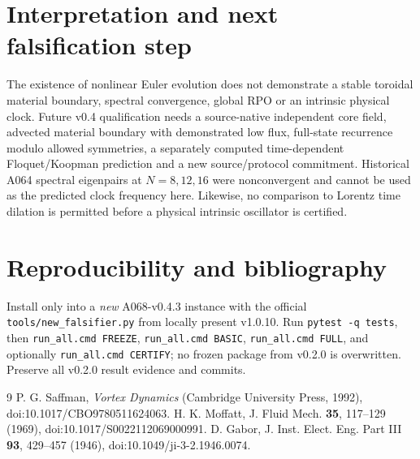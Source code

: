 \documentclass[11pt,a4paper]{article}
\begin{document}
\section{Interpretation and next falsification step}
The existence of nonlinear Euler evolution does not demonstrate a stable toroidal material boundary, spectral convergence, global RPO or an intrinsic physical clock. Future v0.4 qualification needs a source-native independent core field, advected material boundary with demonstrated low flux, full-state recurrence modulo allowed symmetries, a separately computed time-dependent Floquet/Koopman prediction and a new source/protocol commitment. Historical A064 spectral eigenpairs at $N=8,12,16$ were nonconvergent and cannot be used as the predicted clock frequency here. Likewise, no comparison to Lorentz time dilation is permitted before a physical intrinsic oscillator is certified.

\section{Reproducibility and bibliography}
Install only into a \emph{new} A068-v0.4.3 instance with the official \texttt{tools/new\_falsifier.py} from locally present v1.0.10. Run \texttt{pytest -q tests}, then \texttt{run\_all.cmd FREEZE}, \texttt{run\_all.cmd BASIC}, \texttt{run\_all.cmd FULL}, and optionally \texttt{run\_all.cmd CERTIFY}; no frozen package from v0.2.0 is overwritten. Preserve all v0.2.0 result evidence and commits.\par
\begin{thebibliography}{9}
 P. G. Saffman, \emph{Vortex Dynamics} (Cambridge University Press, 1992), doi:10.1017/CBO9780511624063.
 H. K. Moffatt, J. Fluid Mech. \textbf{35}, 117--129 (1969), doi:10.1017/S0022112069000991.
 D. Gabor, J. Inst. Elect. Eng. Part III \textbf{93}, 429--457 (1946), doi:10.1049/ji-3-2.1946.0074.
\end{thebibliography}
\end{document}
